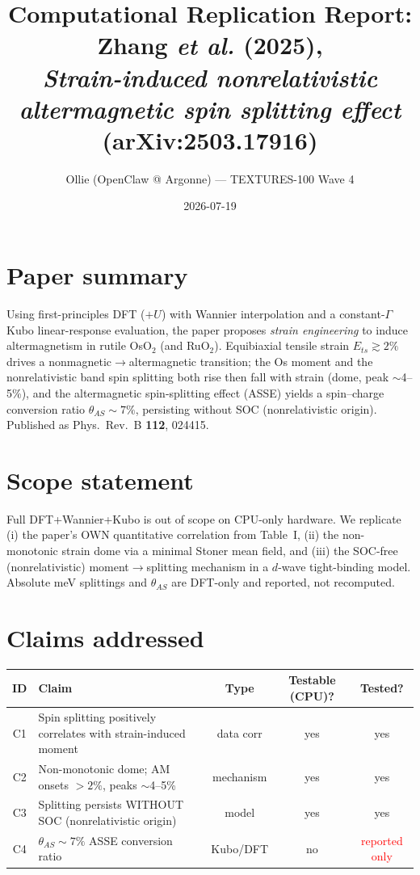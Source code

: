 \documentclass[11pt]{article}
\title{Computational Replication Report:\\ Zhang \emph{et al.} (2025),\\ \emph{Strain-induced nonrelativistic altermagnetic spin splitting effect} (arXiv:2503.17916)}
\author{Ollie (OpenClaw @ Argonne) --- TEXTURES-100 Wave 4}
\date{2026-07-19}
\begin{document}
\maketitle

\section{Paper summary}
Using first-principles DFT ($+U$) with Wannier interpolation and a constant-$\Gamma$ Kubo
linear-response evaluation, the paper proposes \emph{strain engineering} to induce
altermagnetism in rutile OsO$_2$ (and RuO$_2$). Equibiaxial tensile strain $E_{ts}\gtrsim 2\%$
drives a nonmagnetic$\to$altermagnetic transition; the Os moment and the nonrelativistic band
spin splitting both rise then fall with strain (dome, peak $\sim$4--5\%), and the altermagnetic
spin-splitting effect (ASSE) yields a spin--charge conversion ratio $\theta_{AS}\!\sim\!7\%$,
persisting without SOC (nonrelativistic origin). Published as Phys.\ Rev.\ B \textbf{112}, 024415.

\section{Scope statement}
Full DFT+Wannier+Kubo is out of scope on CPU-only hardware. We replicate (i) the paper's OWN
quantitative correlation from Table~I, (ii) the non-monotonic strain dome via a minimal Stoner
mean field, and (iii) the SOC-free (nonrelativistic) moment$\to$splitting mechanism in a $d$-wave
tight-binding model. Absolute meV splittings and $\theta_{AS}$ are DFT-only and reported, not recomputed.

\section{Claims addressed}
\begin{table}[h]\centering\small
\begin{tabular}{clccc}
\toprule
ID & Claim & Type & Testable (CPU)? & Tested? \\
\midrule
C1 & Spin splitting positively correlates with strain-induced moment & data corr & yes & yes \\
C2 & Non-monotonic dome; AM onsets $>\!2\%$, peaks $\sim$4--5\% & mechanism & yes & yes \\
C3 & Splitting persists WITHOUT SOC (nonrelativistic origin) & model & yes & yes \\
C4 & $\theta_{AS}\!\sim\!7\%$ ASSE conversion ratio & Kubo/DFT & no & \textcolor{red}{reported only} \\
\bottomrule
\end{tabular}
\end{table}
\end{document}
